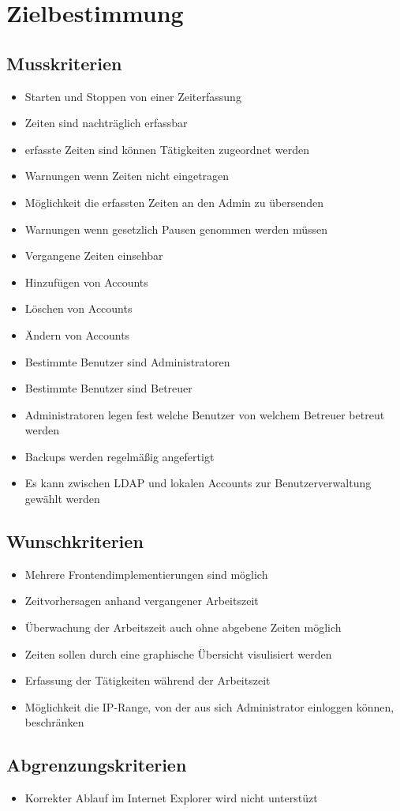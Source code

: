 \section{Zielbestimmung}

\subsection{Musskriterien}

\begin{itemize}
	\item Starten und Stoppen von einer Zeiterfassung
	\item Zeiten sind nachträglich erfassbar
	\item erfasste Zeiten sind können Tätigkeiten zugeordnet werden
	\item Warnungen wenn Zeiten nicht eingetragen
	\item Möglichkeit die erfassten Zeiten an den Admin zu übersenden
	\item Warnungen wenn gesetzlich Pausen genommen werden müssen
	\item Vergangene Zeiten einsehbar
	\item Hinzufügen von Accounts
	\item Löschen von Accounts
	\item Ändern von Accounts
	\item Bestimmte Benutzer sind Administratoren
	\item Bestimmte Benutzer sind Betreuer
	\item Administratoren legen fest welche Benutzer von welchem Betreuer betreut werden
	\item Backups werden regelmäßig angefertigt
	\item Es kann zwischen LDAP und lokalen Accounts zur Benutzerverwaltung gewählt werden
\end{itemize}


\subsection{Wunschkriterien}

\begin{itemize}
	\item Mehrere Frontendimplementierungen sind möglich
	\item Zeitvorhersagen anhand vergangener Arbeitszeit
	\item Überwachung der Arbeitszeit auch ohne abgebene Zeiten möglich
	\item Zeiten sollen durch eine graphische Übersicht visulisiert werden
	\item Erfassung der Tätigkeiten während der Arbeitszeit
	\item Möglichkeit die IP-Range, von der aus sich Administrator einloggen können, beschränken
\end{itemize}


\subsection{Abgrenzungskriterien}
\begin{itemize}
	\item Korrekter Ablauf im Internet Explorer wird nicht unterstüzt
\end{itemize}
